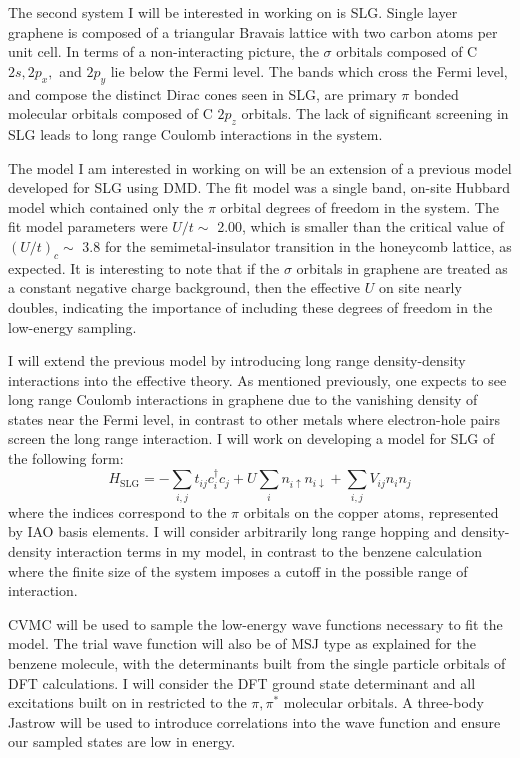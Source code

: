 \documentclass[12pt]{article}
\begin{document}
The second system I will be interested in working on is SLG.
Single layer graphene is composed of a triangular Bravais lattice with two carbon atoms per unit cell.
In terms of a non-interacting picture, the $\sigma$ orbitals composed of C $2s, 2p_x,$ and $2p_y$ lie below the Fermi level.
The bands which cross the Fermi level, and compose the distinct Dirac cones seen in SLG, are primary $\pi$ bonded molecular orbitals composed of C $2p_z$ orbitals.
The lack of significant screening in SLG leads to long range Coulomb interactions in the system.

The model I am interested in working on will be an extension of a previous model developed for SLG using DMD.
The fit model was a single band, on-site Hubbard model which contained only the $\pi$ orbital degrees of freedom in the system.
The fit model parameters were $U/t \sim$ 2.00, which is smaller than the critical value of $(U/t)_c \sim$ 3.8 for the semimetal-insulator transition in the honeycomb lattice, as expected.
It is interesting to note that if the $\sigma$ orbitals in graphene are treated as a constant negative charge background, then the effective $U$ on site nearly doubles, indicating the importance of including these degrees of freedom in the low-energy sampling.

I will extend the previous model by introducing long range density-density interactions into the effective theory.
As mentioned previously, one expects to see long range Coulomb interactions in graphene due to the vanishing density of states near the Fermi level, in contrast to other metals where electron-hole pairs screen the long range interaction.
I will work on developing a model for SLG of the following form:
\begin{equation}
H_\text{SLG} = -\sum_{i,j} t_{ij}c_i^\dagger c_j + U \sum_i n_{i\uparrow}n_{i\downarrow}  + \sum_{i,j} V_{ij} n_i n_j
\label{Hslg}
\end{equation}
where the indices correspond to the $\pi$ orbitals on the copper atoms, represented by IAO basis elements.
I will consider arbitrarily long range hopping and density-density interaction terms in my model, in contrast to the benzene calculation where the finite size of the system imposes a cutoff in the possible range of interaction.

CVMC will be used to sample the low-energy wave functions necessary to fit the model.
The trial wave function will also be of MSJ type as explained for the benzene molecule, with the determinants built from the single particle orbitals of DFT calculations.
I will consider the DFT ground state determinant and all excitations built on in restricted to the $\pi, \pi^*$ molecular orbitals.
A three-body Jastrow will be used to introduce correlations into the wave function and ensure our sampled states are low in energy.
\end{document}
